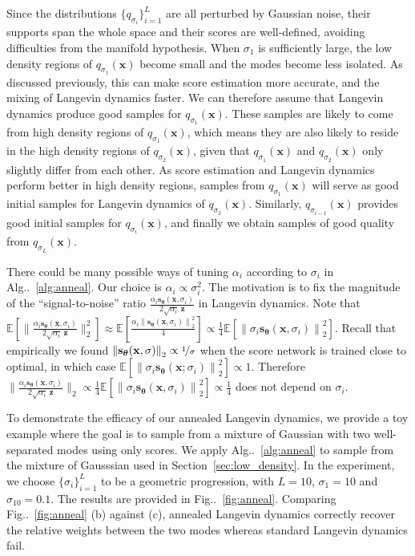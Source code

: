\documentclass{article}
\makeatletter
\newcommand{\mbb}[1]{\mathbb{#1}}
\newcommand{\norm}[1]{\left\lVert#1\right\rVert}
\def\@onedot{\ifx\@let@token.\else.\null\fi\xspace}
\DeclareRobustCommand\onedot{\futurelet\@let@token\@onedot}
\newcommand{\figref}[1]{Fig\onedot~\ref{#1}}
\newcommand{\algoref}[1]{Alg\onedot~\ref{#1}}
\newcommand{\secref}[1]{Section~\ref{#1}}
\newcommand{\bfx}{\mathbf{x}}
\newcommand{\bfz}{\mathbf{z}}
\newcommand{\bftheta}{{\boldsymbol{\theta}}}
\newcommand{\bfs}{\mathbf{s}}
\makeatother
\begin{document}
Since the distributions $\{q_{\sigma_i}\}_{i=1}^L$ are all perturbed by Gaussian noise, their supports span the whole space and their scores are well-defined, avoiding difficulties from the manifold hypothesis. When $\sigma_1$ is sufficiently large, the low density regions of $q_{\sigma_1}(\bfx)$ become small and the modes become less isolated. As discussed previously, this can make score estimation more accurate, and the mixing of Langevin dynamics faster. We can therefore assume that Langevin dynamics produce good samples for $q_{\sigma_1}(\bfx)$. These samples are likely to come from high density regions of $q_{\sigma_1}(\bfx)$, which means they are also likely to reside in the high density regions of $q_{\sigma_2}(\bfx)$, given that $q_{\sigma_1}(\bfx)$ and $q_{\sigma_2}(\bfx)$ only slightly differ from each other. As score estimation and Langevin dynamics perform better in high density regions, samples from $q_{\sigma_1}(\bfx)$ will serve as good initial samples for Langevin dynamics of $q_{\sigma_2}(\bfx)$. Similarly, $q_{\sigma_{i-1}}(\bfx)$ provides good initial samples for $q_{\sigma_i}(\bfx)$, and finally we obtain samples of good quality from $q_{\sigma_L}(\bfx)$.



There could be many possible ways of tuning $\alpha_i$ according to $\sigma_i$ in \algoref{alg:anneal}. Our choice is $\alpha_i \propto \sigma_i^2$. The motivation is to fix the magnitude of the ``signal-to-noise'' ratio $\frac{\alpha_i \bfs_\bftheta(\bfx, \sigma_i)}{2 \sqrt{\alpha_i}~ \bfz}$ in Langevin dynamics. Note that $\mbb{E}[\|\frac{\alpha_i \bfs_\bftheta(\bfx, \sigma_i)}{2\sqrt{\alpha_i}~ \bfz}\|_2^2] \approx \mbb{E}[\frac{\alpha_i \norm{\bfs_\bftheta(\bfx, \sigma_i)}_2^2}{4}] \propto \frac{1}{4}\mbb{E}[\norm{\sigma_i \bfs_\bftheta(\bfx, \sigma_i)}_2^2]$. Recall that empirically we found $\norm{\bfs_\bftheta(\bfx, \sigma)}_2 \propto \nicefrac{1}{\sigma}$ when the score network is trained close to optimal, in which case $\mbb{E}[\norm{\sigma_i \bfs_\bftheta(\bfx; \sigma_i)}_2^2] \propto 1$. Therefore $\|\frac{\alpha_i \bfs_\bftheta(\bfx, \sigma_i)}{2 \sqrt{\alpha_i}~ \bfz}\|_2\propto \frac{1}{4}\mbb{E}[\norm{\sigma_i \bfs_\bftheta(\bfx, \sigma_i)}_2^2] \propto \frac{1}{4}$ does not depend on $\sigma_i$.

To demonstrate the efficacy of our annealed Langevin dynamics, we provide a toy example where the goal is to sample from a mixture of Gaussian with two well-separated modes using only scores. We apply \algoref{alg:anneal} to sample from the mixture of Gausssian used in \secref{sec:low_density}. In the experiment, we choose $\{\sigma_i\}_{i=1}^L$ to be a geometric progression, with $L=10$, $\sigma_1 = 10$ and $\sigma_{10} = 0.1$. The results are provided in \figref{fig:anneal}. Comparing \figref{fig:anneal} (b) against (c), annealed Langevin dynamics correctly recover the relative weights between the two modes whereas standard Langevin dynamics fail.
\end{document}
